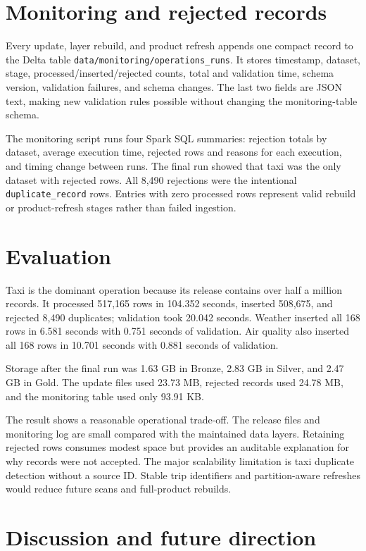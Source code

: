 \documentclass[11pt]{article}
\begin{document}
\section{Monitoring and rejected records}

Every update, layer rebuild, and product refresh appends one compact record to
the Delta table \texttt{data/monitoring/operations\_runs}. It stores timestamp,
dataset, stage, processed/inserted/rejected counts, total and validation time,
schema version, validation failures, and schema changes. The last two fields
are JSON text, making new validation rules possible without changing the
monitoring-table schema.

The monitoring script runs four Spark SQL summaries: rejection totals by
dataset, average execution time, rejected rows and reasons for each execution,
and timing change between runs. The final run showed that taxi was the only
dataset with rejected rows. All 8,490 rejections were the intentional
\texttt{duplicate\_record} rows. Entries with zero processed rows represent
valid rebuild or product-refresh stages rather than failed ingestion.

\section{Evaluation}

Taxi is the dominant operation because its release contains over half a million records. It processed 517,165 rows in 104.352 seconds, inserted 508,675, and rejected 8,490 duplicates; validation took 20.042 seconds. Weather inserted all 168 rows in 6.581 seconds with 0.751 seconds of validation. Air quality also inserted all 168 rows in 10.701 seconds with 0.881 seconds of validation.


Storage after the final run was 1.63 GB in Bronze, 2.83 GB in Silver, and 2.47 GB in Gold. The update files used 23.73 MB, rejected records used 24.78 MB, and the monitoring table used only 93.91 KB.

The result shows a reasonable operational trade-off. The release files and
monitoring log are small compared with the maintained data layers. Retaining
rejected rows consumes modest space but provides an auditable explanation for
why records were not accepted. The major scalability limitation is taxi
duplicate detection without a source ID. Stable trip identifiers and
partition-aware refreshes would reduce future scans and full-product rebuilds.

\section{Discussion and future direction}
\end{document}
